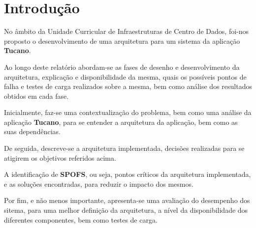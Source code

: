 \chapter{Introdução} \label{chap:intro} %

\hspace{5mm} No âmbito da Unidade Curricular de Infraestruturas de Centro de Dados, foi-nos proposto o desenvolvimento de uma arquitetura para um sistema da aplicação \textbf{Tucano}. 

\hspace{5mm} Ao longo deste relatório abordam-se as fases de desenho e desenvolvimento da arquitetura, explicação e disponibilidade da mesma, quais os possíveis pontos de falha e testes de carga realizados sobre a mesma, bem como análise dos resultados obtidos em cada fase.


\hspace{5mm} Inicialmente, faz-se uma contextualização do problema, bem como uma análise da aplicação \textbf{Tucano}, para se entender a arquitetura da aplicação, bem como as suas dependências. 
 
 
\hspace{5mm} De seguida, descreve-se a arquitetura implementada, decisões realizadas para se atigirem os objetivos referidos acima. 


\hspace{5mm} A identificação de \textbf{SPOFS}, ou seja, pontos críticos da arquitetura implementada, e as soluções encontradas, para reduzir o impacto dos mesmos.


\hspace{5mm} Por fim, e não menos importante, apresenta-se uma avaliação do desempenho dos sitema, para uma melhor definição da arquitetura, a nível da disponibilidade dos diferentes componentes, bem como testes de carga.